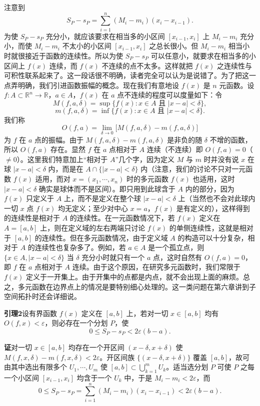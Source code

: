 注意到
\[
 S_P-s_P=\sum_{i=1}^{n}(M_i-m_i)(x_i-x_{i-1}).
\]
为使 $S_P-s_P$ 充分小，就应该要求在相当多的小区间 $[x_{i-1},x_i]$ 上 $M_i-m_i$ 充分小，而使 $M_i-m_i$ 不太小的小区间 $[x_{i-1},x_i]$ 之总长很小。但 $M_i-m_i$ 相当小时就很接近于函数的连续性。所以为使 $S_P-s_P$ 可以任意小，就要求在相当多的小区间上 $f(x)$ 连续，而 $f(x)$ 不连续的点不太多。这样就把 $f(x)$ 之连续性与可积性联系起来了。这一段话很不明确，读者完全可以认为是说错了。为了把这一点弄明确，我们引进函数振幅的概念。现在我们有意地设 $f(x)$ 是 $n$ 元函数。设 $f:A\subset\mathbb R^n\to\mathbb R$，$a\in A$，$f(x)$ 在 $a$ 点不连续的程度可以度量如下：令
\[
 M(f,a,\delta)=\sup\{f(x):x\in A\text{ 且 }|x-a|<\delta\},
\]
\[
 m(f,a,\delta)=\inf\{f(x):x\in A\text{ 且 }|x-a|<\delta\}.
\]
我们称
\[
 O(f,a)=\lim_{\delta\to0}\bigl[M(f,a,\delta)-m(f,a,\delta)\bigr]
\]
为 $f$ 在 $a$ 点的振幅。由于 $M(f,a,\delta)-m(f,a,\delta)$ 是非负的随 $\delta$ 不增的函数，所以 $O(f,a)$ 存在。显然 $f$ 在 $a$ 点相对于 $A$ 连续（不连续）即 $O(f,a)=0$（$\ne0$）。这里我们特意加上“相对于 $A$”几个字，因为定义 $M$ 与 $m$ 时并没有说 $x$ 在球 $|x-a|<\delta$ 内，而是在 $A\cap\{|x-a|<\delta\}$ 内（注意，我们的讨论不只对一元函数 $f(x)$ 适用，而对 $x=(x_1,\cdots,x_n)$ 时的多元函数 $f(x)$ 也适用，这时 $|x-a|<\delta$ 确实是球体而不是区间）。即只用到此球含于 $A$ 内的部分，因为 $f(x)$ 只定义于 $A$ 上，而不是定义在整个球 $|x-a|<\delta$ 上（当然也不会对此球内一切 $x$ 点 $f(x)$ 均无定义；至少对中心 $x=a$，$f(x)$ 是有定义的），这样得到的连续性是相对于 $A$ 的连续性。在一元函数情况下，若 $f(x)$ 定义在 $A=[a,b]$ 上，则在定义域的左右两端只讨论 $f(x)$ 的单侧连续性，这就是相对于 $[a,b]$ 的连续性。但在多元函数情况，由于定义域 $A$ 的构造可以十分复杂，相对于 $A$ 的连续性也复杂多了。例如，若 $a\in A$ 是一个孤立点，则 $\{x\in A,|x-a|<\delta\}$ 当 $\delta$ 充分小时就只有一个 $a$ 点，这时自然有 $O(f,a)=0$，即 $f$ 在 $a$ 点相对于 $A$ 连续。由于这个原因，在研究多元函数时，我们常限于 $f(x)$ 定义于一开集上。由于开集中的点都是内点，就不会出现上面的麻烦。总之，多元函数在边界点上的情况是要特别细心处理的。这一类问题在第六章讲到子空间拓扑时还会详细说。

\noindent\textbf{引理2}\quad 设有界函数 $f(x)$ 定义在 $[a,b]$ 上，若对一切 $x\in[a,b]$ 均有 $O(f,x)<\varepsilon$，则必存在一个分划 $P$，使
\[
 0\le S_P-s_P<2\varepsilon(b-a).
\]

\noindent\textbf{证}\quad 对一切 $x\in[a,b]$ 均存在一个开区间 $(x-\delta,x+\delta)$ 使 $M(f,x,\delta)-m(f,x,\delta)<2\varepsilon$。开区间族 $\{(x-\delta,x+\delta)\}$ 覆盖 $[a,b]$，故可由其中选出有限多个 $U_1,\cdots,U_m$ 使 $[a,b]\subset\bigcup_{k=1}^{m}U_k$。适当选分划 $P$ 可使 $P$ 之每一个小区间 $[x_{i-1},x_i]$ 均含于一个 $U_k$ 中，于是 $M_i-m_i<2\varepsilon$，而
\[
 0\le S_P-s_P=\sum_{i=1}^{n}(M_i-m_i)(x_i-x_{i-1})<2\varepsilon(b-a).
\]

